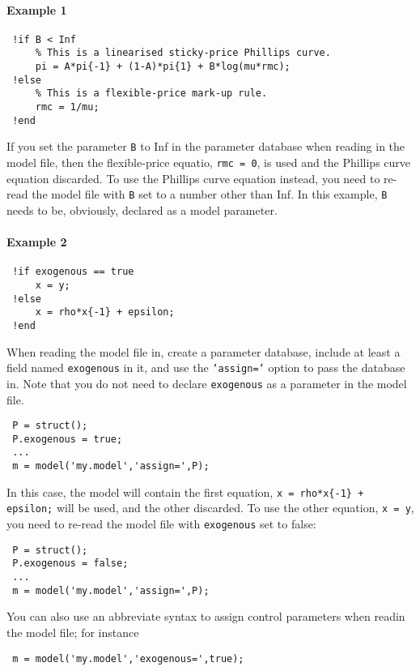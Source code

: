  \paragraph{Example 1}
 
 \begin{verbatim}
 !if B < Inf
     % This is a linearised sticky-price Phillips curve.
     pi = A*pi{-1} + (1-A)*pi{1} + B*log(mu*rmc);
 !else
     % This is a flexible-price mark-up rule.
     rmc = 1/mu;
 !end
 \end{verbatim}
 
 If you set the parameter \texttt{B} to Inf in the parameter database
 when reading in the model file, then the flexible-price equatio,
 \texttt{rmc = 0}, is used and the Phillips curve equation discarded. To
 use the Phillips curve equation instead, you need to re-read the model
 file with \texttt{B} set to a number other than Inf. In this example,
 \texttt{B} needs to be, obviously, declared as a model parameter.
 
 \paragraph{Example 2}
 
 \begin{verbatim}
 !if exogenous == true
     x = y;
 !else
     x = rho*x{-1} + epsilon;
 !end
 \end{verbatim}
 
 When reading the model file in, create a parameter database, include at
 least a field named \texttt{exogenous} in it, and use the
 \texttt{'assign='} option to pass the database in. Note that you do not
 need to declare \texttt{exogenous} as a parameter in the model file.
 
 \begin{verbatim}
 P = struct();
 P.exogenous = true;
 ...
 m = model('my.model','assign=',P);
 \end{verbatim}
 
 In this case, the model will contain the first equation,
 \texttt{x = rho*x\{-1\} + epsilon;} will be used, and the other
 discarded. To use the other equation, \texttt{x = y}, you need to
 re-read the model file with \texttt{exogenous} set to false:
 
 \begin{verbatim}
 P = struct();
 P.exogenous = false;
 ...
 m = model('my.model','assign=',P);
 \end{verbatim}
 
 You can also use an abbreviate syntax to assign control parameters when
 readin the model file; for instance
 
 \begin{verbatim}
 m = model('my.model','exogenous=',true);
 \end{verbatim}


